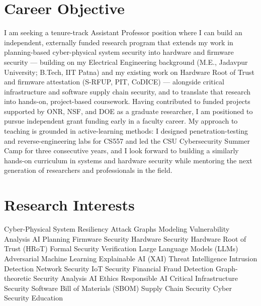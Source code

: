 \documentclass[11pt, a4paper]{article}
\begin{document}
\section{Career Objective}

{\fontsize{10.87}{13.5}\selectfont
I am seeking a tenure-track Assistant Professor position where I can build an independent, externally funded research program that extends my work in planning-based cyber-physical system security into hardware and firmware security --- building on my Electrical Engineering background (M.E., Jadavpur University; B.Tech, IIT Patna) and my existing work on Hardware Root of Trust and firmware attestation (S-RFUP, PIT, CoDICE) --- alongside critical infrastructure and software supply chain security, and to translate that research into hands-on, project-based coursework. Having contributed to funded projects supported by ONR, NSF, and DOE as a graduate researcher, I am positioned to pursue independent grant funding early in a faculty career. My approach to teaching is grounded in active-learning methods: I designed penetration-testing and reverse-engineering labs for CS557 and led the CSU Cybersecurity Summer Camp for three consecutive years, and I look forward to building a similarly hands-on curriculum in systems and hardware security while mentoring the next generation of researchers and professionals in the field.}

\section{Research Interests}

{\fontsize{10.87}{13.5}\selectfont
Cyber-Physical System Resiliency \textbullet{} Attack Graphs Modeling \textbullet{} Vulnerability Analysis \textbullet{} AI Planning \textbullet{} Firmware Security \textbullet{} Hardware Security \textbullet{} Hardware Root of Trust (HRoT) \textbullet{} Formal Security Verification  \textbullet{} Large Language Models (LLMs)  \textbullet{} Adversarial Machine Learning \textbullet{} Explainable AI (XAI) \textbullet{} Threat Intelligence \textbullet{} Intrusion Detection  Network Security \textbullet{}IoT Security \textbullet{} Financial Fraud Detection \textbullet{} Graph-theoretic Security Analysis \textbullet{} AI Ethics \textbullet{} Responsible AI \textbullet{} Critical Infrastructure Security \textbullet{} Software Bill of Materials (SBOM) \textbullet{} Supply Chain Security \textbullet{} Cyber Security Education
}
\end{document}
